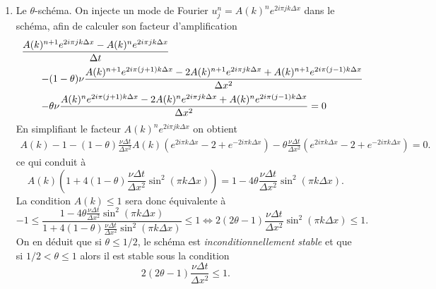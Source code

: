 \documentclass[12pt,a4paper]{article}
\begin{document}
\begin{enumerate}
\item Le $\theta$-sch\'ema. On injecte un mode de Fourier
  $u_j^n=A(k)^ne^{2i\pi j k\Delta x}$ dans le sch\'ema, afin de calculer
  son facteur d'amplification
$$
\begin{array}{l}
\displaystyle\frac{ A(k)^{n+1}e^{2i\pi jk\Delta x}- A(k)^{n}e^{2i\pi jk\Delta
    x}}{\Delta t} \\[2ex]
\qquad - (1-\theta)\displaystyle\displaystyle\nu\frac{A(k)^{n+1}e^{2i\pi (j+1)k\Delta
    x}-2 A(k)^{n+1}e^{2i\pi jk\Delta
    x} +A(k)^{n+1}e^{2i\pi (j-1)k\Delta
    x}}{\Delta x^2}\\[2ex]
\qquad- \displaystyle \theta\displaystyle\nu\frac{A(k)^{n}e^{2i\pi (j+1)k\Delta
    x}-2 A(k)^{n}e^{2i\pi jk\Delta
    x} +A(k)^{n}e^{2i\pi (j-1)k\Delta
    x}}{\Delta x^2}=0
\end{array}
$$
En simplifiant le facteur $A(k)^ne^{2i\pi jk\Delta x}$ on obtient
$$
\begin{array}{l}
\displaystyle A(k)-1-(1-\theta)\frac{\nu\Delta t}{\Delta x^2}A(k)(e^{2i\pi
  k \Delta  x} -2
+e^{-2i\pi k\Delta  x})-\theta\frac{\nu\Delta t}{\Delta x^2}(e^{2i\pi k\Delta  x} -2
+e^{-2i\pi k\Delta  x})=0.
\end{array}
$$
ce qui conduit \`a
$$
A(k)\left(1+4(1-\theta)\displaystyle\frac{\nu\Delta t}{\Delta
    x^2}\sin^2(\pi k\Delta x)\right)=1-4\theta
\displaystyle\frac{\nu\Delta t}{\Delta x^2}\sin^2(\pi k\Delta x).
$$
La condition $A(k)\le 1$ sera donc \'equivalente \`a
$$
-1\le \frac{1-4\theta \displaystyle\frac{\nu\Delta t}{\Delta
    x^2}\sin^2(\pi k\Delta x)}{1+4(1-\theta) \displaystyle\frac{\nu\Delta
    t}{\Delta x^2}\sin^2(\pi k\Delta x)}\le 1 \Leftrightarrow 2(2\theta-1) \displaystyle\frac{\nu\Delta
    t}{\Delta x^2}\sin^2(\pi k\Delta x)\le 1.
$$
On en d\'eduit que si $\theta \le 1/2$, le sch\'ema est
{\it inconditionnellement stable} et que si $1/2 < \theta \le 1$ alors il est
stable sous la condition $$2(2\theta-1)\frac{\nu\Delta
    t}{\Delta x^2} \le 1.$$ 
    

\end{enumerate}
\end{document}
